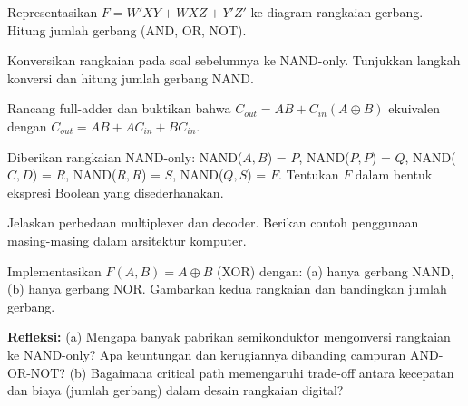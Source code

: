 \documentclass[../main]{subfiles}
\begin{document}

\begin{latihan}
  \item Representasikan $F = W'XY + WXZ + Y'Z'$ ke diagram rangkaian gerbang. Hitung jumlah gerbang (AND, OR, NOT).
  \item Konversikan rangkaian pada soal sebelumnya ke NAND-only. Tunjukkan langkah konversi dan hitung jumlah gerbang NAND.
  \item Rancang full-adder dan buktikan bahwa $C_{out} = AB + C_{in}(A \oplus B)$ ekuivalen dengan $C_{out} = AB + AC_{in} + BC_{in}$.
  \item Diberikan rangkaian NAND-only: NAND($A,B$) = $P$, NAND($P,P$) = $Q$, NAND($C,D$) = $R$, NAND($R,R$) = $S$, NAND($Q,S$) = $F$. Tentukan $F$ dalam bentuk ekspresi Boolean yang disederhanakan.
  \item Jelaskan perbedaan multiplexer dan decoder. Berikan contoh penggunaan masing-masing dalam arsitektur komputer.
  \item Implementasikan $F(A,B) = A \oplus B$ (XOR) dengan: (a) hanya gerbang NAND, (b) hanya gerbang NOR. Gambarkan kedua rangkaian dan bandingkan jumlah gerbang.
  \item \textbf{Refleksi:} (a) Mengapa banyak pabrikan semikonduktor mengonversi rangkaian ke NAND-only? Apa keuntungan dan kerugiannya dibanding campuran AND-OR-NOT? (b) Bagaimana critical path memengaruhi trade-off antara kecepatan dan biaya (jumlah gerbang) dalam desain rangkaian digital?
\end{latihan}

\end{document}
